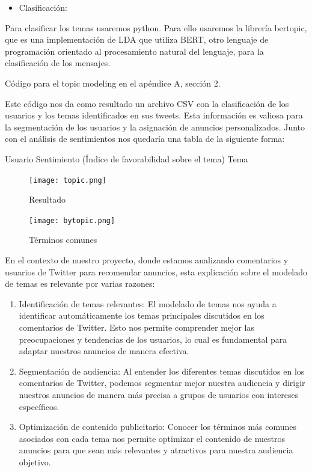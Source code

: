 \documentclass[
  letterpaper,
  DIV=11,
  numbers=noendperiod]{scrartcl}
\providecommand{\tightlist}{%
  \setlength{\itemsep}{0pt}\setlength{\parskip}{0pt}}\usepackage{longtable,booktabs,array}
\begin{document}
\begin{itemize}
\tightlist
\item
  Clasificación:
\end{itemize}

Para clasificar los temas usaremos python. Para ello usaremos la
librería bertopic, que es una implementación de LDA que utiliza BERT,
otro lenguaje de programación orientado al procesamiento natural del
lenguaje, para la clasificación de los mensajes.

Código para el topic modeling en el apéndice A, sección 2.

Este código nos da como resultado un archivo CSV con la clasificación de
los usuarios y los temas identificados en sus tweets. Esta información
es valiosa para la segmentación de los usuarios y la asignación de
anuncios personalizados. Junto con el análisis de sentimientos nos
quedaría una tabla de la siguiente forma:

Usuario \textbar{} Sentimiento (Índice de favorabilidad sobre el tema)
\textbar{} Tema \textbar{}

\begin{figure}[H]

{\centering \texttt{[image: topic.png]}

}

\caption{Resultado}

\end{figure}%

\begin{figure}[htbp]
    \centering
    \texttt{[image: bytopic.png]}
    \caption{Términos comunes}
    \label{fig:terminos_comunes}
\end{figure}

En el contexto de nuestro proyecto, donde estamos analizando comentarios
y usuarios de Twitter para recomendar anuncios, esta explicación sobre
el modelado de temas es relevante por varias razones:

\begin{enumerate}
\def\labelenumi{\arabic{enumi}.}
\item
  Identificación de temas relevantes: El modelado de temas nos ayuda a
  identificar automáticamente los temas principales discutidos en los
  comentarios de Twitter. Esto nos permite comprender mejor las
  preocupaciones y tendencias de los usuarios, lo cual es fundamental
  para adaptar nuestros anuncios de manera efectiva.
\item
  Segmentación de audiencia: Al entender los diferentes temas discutidos
  en los comentarios de Twitter, podemos segmentar mejor nuestra
  audiencia y dirigir nuestros anuncios de manera más precisa a grupos
  de usuarios con intereses específicos.
\item
  Optimización de contenido publicitario: Conocer los términos más
  comunes asociados con cada tema nos permite optimizar el contenido de
  nuestros anuncios para que sean más relevantes y atractivos para
  nuestra audiencia objetivo.
\end{enumerate}
\end{document}
